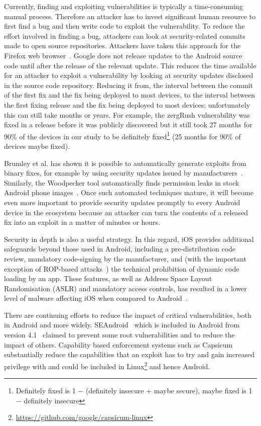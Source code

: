 \documentclass{llncs}
\begin{document}
Currently, finding and exploiting vulnerabilities is typically a time-consuming manual process.
Therefore an attacker has to invest significant human resource to first find a bug and then write code to exploit the vulnerability.
To reduce the effort involved in finding a bug, attackers can look at security-related commits made to open source repositories.
Attackers have taken this approach for the Firefox web browser~\cite{Barth2011}.
Google does not release updates to the Android source code until after the release of the relevant update.
This reduces the time available for an attacker to exploit a vulnerability by looking at security updates disclosed in the source code repository.
Reducing it from, the interval between the commit of the first fix and the fix being deployed to most devices, to the interval between the first fixing release and the fix being deployed to most devices; unfortunately this can still take months or years.
For example, the zergRush vulnerability was fixed in a release before it was publicly discovered but it still took 27 months for 90\% of the devices in our study to be definitely fixed\footnote{Definitely fixed is 1 $-$ (definitely insecure + maybe secure), maybe fixed is 1 $-$ definitely insecure} (25 months for 90\% of devices maybe fixed).

Brumley et al. has shown it is possible to automatically generate exploits from binary fixes, for example by using security updates issued by manufacturers~\cite{Brumley2008}. 
Similarly, the Woodpecker tool automatically finds permission leaks in stock Android phone images~\cite{Grace2012}.
Once such automated techniques mature, it will become even more important to provide security updates promptly to every Android device in the ecosystem because an attacker can turn the contents of a released fix into an exploit in a matter of minutes or hours.

Security in depth is also a useful strategy.
In this regard, iOS provides additional safeguards beyond those used in Android, including a pre-distribution code review, mandatory code-signing by the manufacturer, and (with the important exception of ROP-based attacks~\cite{Wang2013a}) the technical prohibition of dynamic code loading by an app.
These features, as well as Address Space Layout Randomisation (ASLR) and mandatory access controls, has resulted in a lower level of malware affecting iOS when compared to Android~\cite{Felt2011}.

There are continuing efforts to reduce the impact of critical vulnerabilities, both in Android and more widely.
SEAndroid~\cite{Smalley2013} which is included in Android from version 4.1~\cite{jelly-bean-release} claimed to prevent some root vulnerabilities and to reduce the impact of others.
Capability based enforcement systems such as Capsicum~\cite{Watson2010} substantially reduce the capabilities that an exploit has to try and gain increased privilege with and could be included in Linux\footnote{\url{https://github.com/google/capsicum-linux}} and hence Android.
\end{document}
